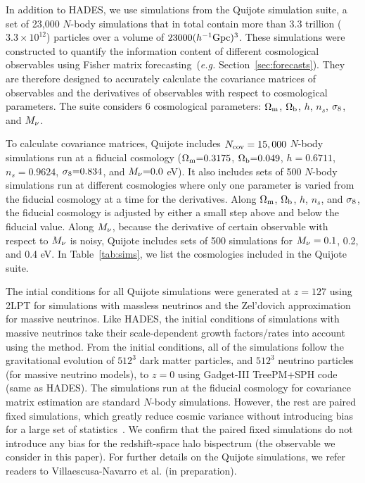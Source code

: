 In addition to HADES, we use simulations from the Quijote simulation suite, a
set of 23,000 $N$-body simulations that in total contain more than 3.3 trillion 
($3.3\times10^{12}$) particles over a volume of $23000 (h^{-1}{\rm Gpc})^3$. 
These simulations were constructed to quantify the information content of 
different cosmological observables using Fisher matrix forecasting~(\emph{e.g.} 
Section~\ref{sec:forecasts}). They are therefore designed to accurately calculate 
the covariance matrices of observables and the derivatives of observables with 
respect to cosmological parameters. The suite considers 6 cosmological parameters: 
$\Omega_{\rm m}$, $\Omega_{\rm b}$, $h$, $n_s$, $\sigma_8$, and $M_\nu$.

To calculate covariance matrices, Quijote includes $N_{\rm cov} = 15,000$ $N$-body 
simulations run at a fiducial cosmology ($\Omega_{\rm m}{=}0.3175$, $\Omega_{\rm b}{=}0.049$, $h{=}0.6711$, 
$n_s{=}0.9624$, $\sigma_8{=}0.834$, and $M_\nu{=}0.0$ eV). It also includes sets 
of 500 $N$-body simulations run at different cosmologies where only one parameter 
is varied from the fiducial cosmology at a time for the derivatives. Along $\Omega_{\rm m}$, 
$\Omega_{\rm b}$, $h$, $n_s$, and $\sigma_8$, the fiducial cosmology is adjusted by either a 
small step above and below the fiducial value. Along $M_\nu$, because the 
derivative of certain observable with respect to $M_\nu$ is noisy, Quijote 
includes sets of 500 simulations for $M_\nu = 0.1$, 0.2, and 0.4 eV. In 
Table~\ref{tab:sims}, we list the cosmologies included in the Quijote suite. 

The intial conditions for all Quijote simulations were generated at $z=127$ using 
2LPT for simulations with massless neutrinos and the Zel’dovich approximation for 
massive neutrinos. Like HADES, the initial conditions of simulations with massive
neutrinos take their scale-dependent growth factors/rates into account using the
\cite{zennaro2017a} method. From the initial conditions, all of the simulations 
follow the gravitational evolution of $512^3$ dark matter particles, and $512^3$ 
neutrino particles (for massive neutrino models), to $z=0$ using {\sc Gadget-III}
TreePM+SPH code (same as HADES). The simulations run at the fiducial cosmology for 
covariance matrix estimation are standard $N$-body simulations. However, the rest 
are paired fixed simulations, which greatly reduce cosmic variance without introducing 
bias for a large set of statistics~\citep{angulo2016,pontzen2016,villaescusa-navarro2018}. 
We confirm that the paired fixed simulations do not introduce any bias for the 
redshift-space halo bispectrum (the observable we consider in this paper). For 
further details on the Quijote simulations, we refer readers to 
Villaescusa-Navarro et al. (in preparation). 

